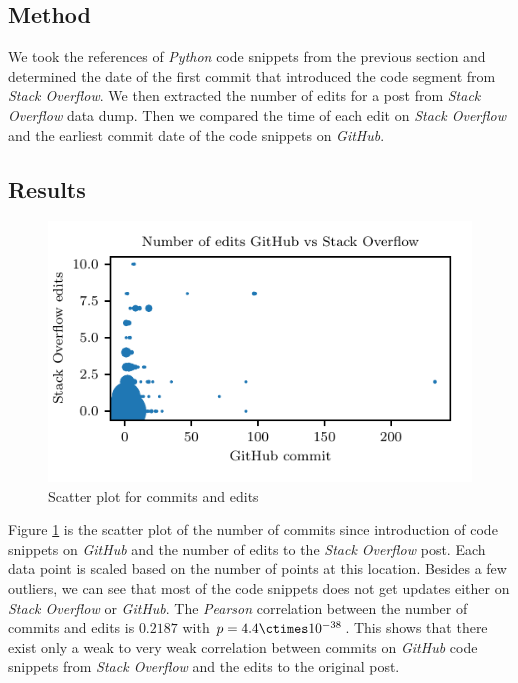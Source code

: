 \documentclass[sigconf]{acmart}
\begin{document}
\subsection{Method}
We took the references of \textit{Python} code snippets from the previous section and determined the date of the first commit that introduced the code segment from \textit{Stack Overflow}. We then extracted the number of edits for a post from \textit{Stack Overflow} data dump. Then we compared the time of each edit on \textit{Stack Overflow} and the earliest commit date of the code snippets on \textit{GitHub}.

\subsection{Results}

\begin{figure}[h]
\centering
\includegraphics[width=\linewidth]{Figure_5.pdf}
\caption{Scatter plot for commits and edits}
\label{fig:ghsouc}
\end{figure}

Figure \ref{fig:ghsouc} is the scatter plot of the number of commits since introduction of code snippets on \textit{GitHub} and the number of edits to the \textit{Stack Overflow} post. Each data point is scaled based on the number of points at this location. Besides a few outliers, we can see that most of the code snippets does not get updates either on \textit{Stack Overflow} or \textit{GitHub}. The \textit{Pearson} correlation between the number of commits and edits is $0.2187$ with $p = 4.4 \ctimes 10^{-38}$. This shows that there exist only a weak to very weak correlation between commits on \textit{GitHub} code snippets from \textit{Stack Overflow} and the edits to the original post.
\end{document}
